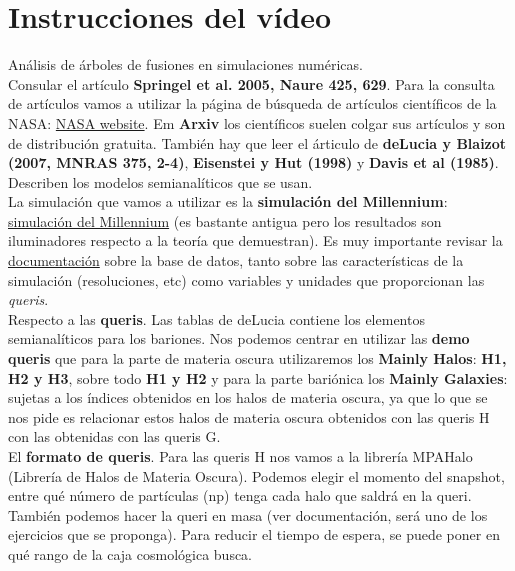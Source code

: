 \documentclass[8pt, a4paper]{article} %
\begin{document}
\renewcommand{\tablename}{\textit{Tabla}}
\renewcommand{\figurename}{\textit{Figura}}


\section{\textcolor{ceruleanblue}{Instrucciones del vídeo}}

Análisis de árboles de fusiones en simulaciones numéricas. \\

Consular el artículo \textbf{Springel et al. 2005, Naure 425, 629}. Para la consulta de artículos vamos a utilizar la página de búsqueda de artículos científicos de la NASA: \href{http://adsabs.harvard.edu/abstract_service.html}{NASA website}. Em \textbf{Arxiv} los científicos suelen colgar sus artículos y son de distribución gratuita. También hay que leer el árticulo de \textbf{deLucia y Blaizot (2007, MNRAS 375, 2-4)}, \textbf{Eisenstei y Hut (1998)} y \textbf{Davis et al (1985)}. Describen los modelos semianalíticos que se usan. \\

La simulación que vamos a utilizar es la \textbf{simulación del Millennium}: \href{http://gavo.mpa-garching.mpg.de/Millennium/}{simulación del Millennium} (es bastante antigua pero los resultados son iluminadores respecto a la teoría que demuestran). Es muy importante revisar la \href{http://gavo.mpa-garching.mpg.de/Millennium/Help}{documentación} sobre la base de datos, tanto sobre las características de la simulación (resoluciones, etc) como variables y unidades que proporcionan las \textit{queris}. \\

Respecto a las \textbf{queris}. Las tablas de deLucia contiene los elementos semianalíticos para los bariones. Nos podemos centrar en utilizar las \textbf{demo queris} que para la parte de materia oscura utilizaremos los \textbf{Mainly Halos}: \textbf{H1, H2 y H3}, sobre todo \textbf{H1 y H2} y para la parte bariónica los \textbf{Mainly Galaxies}: sujetas a los índices obtenidos en los halos de materia oscura, ya que lo que se nos pide es relacionar estos halos de materia oscura obtenidos con las queris H con las obtenidas con las queris G. \\

El \textbf{formato de queris}. Para las queris H nos vamos a la librería MPAHalo (Librería de Halos de Materia Oscura). Podemos elegir el momento del snapshot, entre qué número de partículas (np) tenga cada halo que saldrá en la queri. También podemos hacer la queri en masa (ver documentación, será uno de los ejercicios que se proponga). Para reducir el tiempo de espera, se puede poner en qué rango de la caja cosmológica busca. \\
\end{document}
